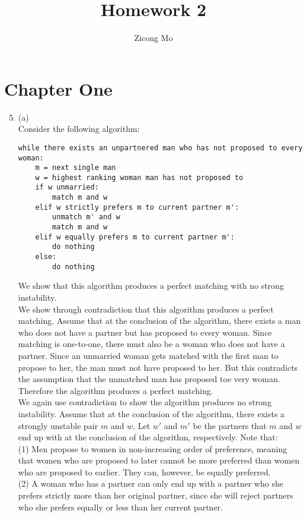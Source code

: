 \documentclass[oneside, 12pt]{article}
\begin{document}
\title{Homework 2}
\author{Zicong Mo}
\maketitle
\section*{Chapter One}
\begin{enumerate}
\setcounter{enumi}{4}
\item
(a) \\
Consider the following algorithm:
\begin{lstlisting}
while there exists an unpartnered man who has not proposed to every woman:
	m = next single man
	w = highest ranking woman man has not proposed to
	if w unmarried:
		match m and w
	elif w strictly prefers m to current partner m':
		unmatch m' and w
		match m and w
	elif w equally prefers m to current partner m':
		do nothing
	else:
		do nothing
\end{lstlisting}
We show that this algorithm produces a perfect matching with no strong instability. \\
\newline
We show through contradiction that this algorithm produces a perfect matching. Assume that at the conclusion of the algorithm, there exists a man who does not have a partner but has proposed to every woman. Since matching is one-to-one, there must also be a woman who does not have a partner. Since an unmarried woman gets matched with the first man to propose to her, the man must not have proposed to her. But this contradicts the assumption that the unmatched man has proposed toe very woman. Therefore the algorithm produces a perfect matching. \\
\newline
We again use contradiction to show the algorithm produces no strong instability. Assume that at the conclusion of the algorithm, there exists a strongly unstable pair $m$ and $w$. Let $w'$ and $m'$ be the partners that $m$ and $w$ end up with at the conclusion of the algorithm, respectively. Note that: \\
(1) Men propose to women in non-increasing order of preference, meaning that women who are proposed to later cannot be more preferred than women who are proposed to earlier. They can, however, be equally preferred.\\
(2) A woman who has a partner can only end up with a partner who she prefers strictly more than her original partner, since she will reject partners who she prefers equally or less than her current partner.\\

\end{enumerate}
\end{document}
